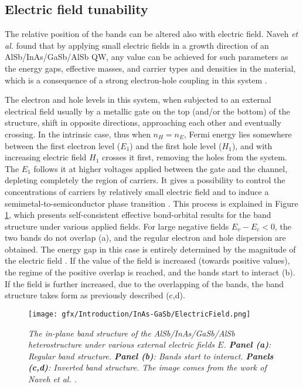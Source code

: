 \documentclass[titlepage,a4paper]{book}
\newcommand{\wciecie}{\quad\phantom{v}}
\begin{document}
\subsection{Electric field tunability}
\wciecie
The relative position of the bands can be altered also with electric field. Naveh \textit{et al.} found that by applying small electric fields in a growth direction of an AlSb/InAs/GaSb/AlSb QW, any value can be achieved for such parameters as the energy gaps, effective masses, and carrier types and densities in the material, which is a consequence of a strong electron-hole coupling in this system \cite{Naveh_ElectricField}. 

The electron and hole levels in this system, when subjected to an external electrical field usually by a metallic gate on the top (and/or the bottom) of the structure, shift in opposite directions, approaching each other and eventually crossing. In the intrinsic case, thus when $n_H = n_E$, Fermi energy lies somewhere between the first electron level ($E_1$) and the first hole level ($H_1$), and with increasing electric field $H_1$ crosses it first, removing the holes from the system. The $E_1$ follows it at higher voltages applied between the gate and the channel, depleting completely the region of carriers. It gives a possibility to control the concentrations of carriers by relatively small electric field and to induce a semimetal-to-semiconductor phase transition \cite{Mendez_ElectricField}. This process is explained in Figure \ref{fig:ElectricField_InAs}, which presents self-consistent effective bond-orbital results for the band structure under various applied fields. For large negative fields $E_v - E_c < 0$, the two bands do not overlap (a), and the regular electron and hole dispersion are obtained. The energy gap in this case is entirely determined by the magnitude of the electric field \cite{Naveh_ElectricField}. If the value of the field is increased (towards positive values), the regime of the positive overlap is reached, and the bands start to interact (b). If the field is further increased, due to the overlapping of the bands, the band structure takes form as previously described (c,d).

\begin{figure}[ht]
	\centering
	\texttt{[image: gfx/Introduction/InAs-GaSb/ElectricField.png]}
	\vspace{-10pt}
	\caption{\textit{The in-plane band structure of the AlSb/InAs/GaSb/AlSb heterostructure under various external electric fields $E$. \textbf{Panel (a)}: Regular band structure. \textbf{Panel (b)}: Bands start to interact. \textbf{Panels (c,d)}: Inverted band structure. The image comes from the work of Naveh \textit{et al.} \cite{Naveh_ElectricField}.}}
	\label{fig:ElectricField_InAs}
\end{figure} 
\end{document}
